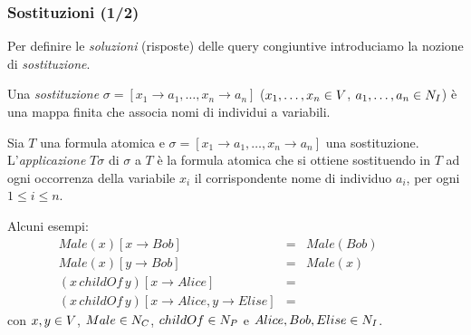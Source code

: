 \documentclass[8pt]{beamer}
\begin{document}
\begin{frame}
\frametitle{Sostituzioni (1/2)}

Per definire le \emph{soluzioni} (risposte) delle query congiuntive introduciamo la
nozione di \emph{sostituzione}.
\vspace{\baselineskip}

Una \emph{sostituzione} $\sigma=[x_1 \rightarrow a_1, \ldots, x_n \rightarrow a_n]$
($x_1, \ldots, x_n \in V$, $a_1, \ldots, a_n \in N_I$)
\`e una mappa finita che associa nomi di individui a variabili.
\vspace{\baselineskip}

Sia $T$ una formula atomica e $\sigma=[x_1 \rightarrow a_1, \ldots, x_n \rightarrow a_n]$
una sostituzione. L'\emph{applicazione} $T\sigma$ di $\sigma$ a $T$ \`e la formula atomica 
che si ottiene sostituendo in $T$ ad ogni occorrenza della variabile $x_i$ il
corrispondente nome di individuo $a_i$, per ogni $1\leq i\leq n$.
\vspace{\baselineskip}

Alcuni esempi:
\[
 \begin{array}{lcl}
  Male(x)[x \rightarrow Bob] & = & Male(Bob) \\
  Male(x)[y \rightarrow Bob] & = & Male(x) \\
  (x\,childOf\,y)[x \rightarrow Alice] & = & \phantom{Alice\,childOf\,y} \\
  (x\,childOf\,y)[x \rightarrow Alice, y \rightarrow Elise] & = & \phantom{Alice\,childOf\,Elise}
 \end{array}
\]
con $x,y \in V$, $Male \in N_C$, $childOf \in N_P$ e $Alice, Bob, Elise \in N_I$.
\end{frame}
\end{document}
